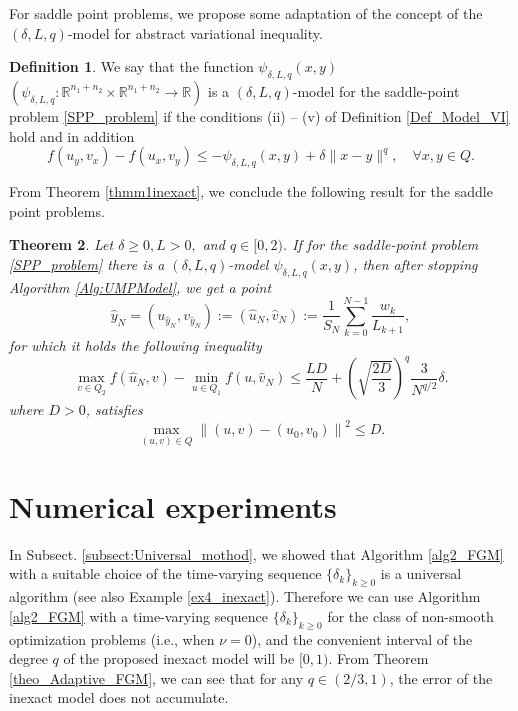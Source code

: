 \documentclass[11pt]{amsart}
\newtheorem{theorem}{Theorem}[section]
\theoremstyle{definition}
\newtheorem{definition}[theorem]{Definition}
\numberwithin{equation}{section}
\begin{document}
For saddle point problems, we propose some adaptation of the concept of the $(\delta, L, q)$-model for abstract variational inequality.

\begin{definition}\label{DefSaddleModel}
We say that the function $\psi_{\delta, L,q}(x,y)$ $(\psi_{\delta, L, q}:\mathbb{R}^{n_1+n_2}\times\mathbb{R}^{n_1 + n_2}\longrightarrow\mathbb{R})$ is a $(\delta,L,q)$-model for the saddle-point problem \eqref{SPP_problem} if the conditions (ii) -- (v) of Definition \ref{Def_Model_VI} hold and in addition
\begin{equation}\label{eq33}
    f(u_y,v_x)-f(u_x,v_y)\leq-\psi_{\delta, L,q}(x,y) + \delta\|x- y\|^q,  \quad \forall x, y \in Q.
\end{equation}
\end{definition}

From Theorem \ref{thmm1inexact}, we conclude the following result for the saddle point problems.
\begin{theorem}
Let $\delta \geq 0, L >0,$ and $ q \in [0,2)$. If for the saddle-point problem \eqref{SPP_problem} there is a $(\delta,L,q)$-model $\psi_{\delta, L,q}(x,y)$, then after stopping Algorithm \ref{Alg:UMPModel},  we get a point
\begin{equation}\label{eq36}
    \widehat{y}_N=(u_{\widehat{y}_N},v_{\widehat{y}_N}):=(\widehat{u}_N, \widehat{v}_N):=\frac{1}{S_N}\sum_{k=0}^{N-1}\frac{w_{k}}{L_{k+1}},
\end{equation}
for which it holds the following inequality 
\begin{equation}\label{eq37}
    \max_{v\in Q_2}f(\widehat{u}_N, v)-\min_{u\in Q_1}f(u, \widehat{v}_N)\leq \frac{LD}{N} + \left(\sqrt{\frac{2D}{3}}\right)^q \frac{3}{N^{q/2}}  \delta.  
\end{equation}
where $D >0 $, satisfies
\[
    \max_{(u,v) \in Q} \left\|(u, v) - (u_0, v_0)\right\|^2   \leq D. 
\]
\end{theorem}


\section{Numerical experiments}\label{sect_numerical}

In Subsect. \ref{subsect:Universal_mothod}, we showed that Algorithm \ref{alg2_FGM} with a suitable choice of the time-varying sequence $\{\delta_k\}_{k \geq 0}$ is a universal algorithm (see also Example \ref{ex4_inexact}). Therefore we can use Algorithm \ref{alg2_FGM} with a time-varying sequence $\{\delta_k\}_{k \geq 0}$ for the class of non-smooth optimization problems (i.e., when $\nu = 0$), and the convenient interval of the degree $q$ of the proposed inexact model will be $[0, 1)$. From Theorem \ref{theo_Adaptive_FGM}, we can see that for any $q \in (2/3, 1)$, the error of the inexact model does not accumulate. 
\end{document}
